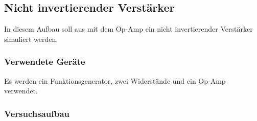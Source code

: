 \documentclass[12pt,a4paper]{article}
\begin{document}
\subsection{Nicht invertierender Verstärker}

In diesem Aufbau soll aus mit dem Op-Amp ein nicht invertierender Verstärker simuliert werden.

\subsubsection{Verwendete Geräte}

Es werden ein Funktionsgenerator, zwei Widerstände und ein Op-Amp verwendet.


\subsubsection{Versuchsaufbau}
\end{document}
